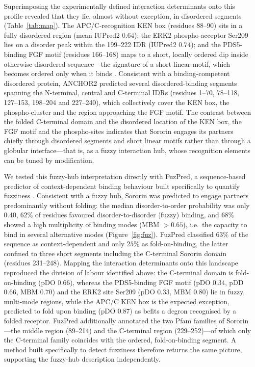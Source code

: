 \documentclass[11pt]{article}
\begin{document}
Superimposing the experimentally defined interaction determinants onto this profile revealed that they lie, almost without exception, in disordered segments (Table~\ref{tab:map}). The APC/C-recognition KEN box (residues 88--90) sits in a fully disordered region (mean IUPred2 $0.64$); the ERK2 phospho-acceptor Ser209 lies on a disorder peak within the 199--222 IDR (IUPred2 $0.74$); and the PDS5-binding FGF motif (residues 166--168) maps to a short, locally ordered dip inside otherwise disordered sequence---the signature of a short linear motif, which becomes ordered only when it binds \citep{fuxreiter2007,davey2012}. Consistent with a binding-competent disordered protein, ANCHOR2 predicted several disordered-binding segments spanning the N-terminal, central and C-terminal IDRs (residues 1--70, 78--118, 127--153, 198--204 and 227--240), which collectively cover the KEN box, the phospho-cluster and the region approaching the FGF motif. The contrast between the folded C-terminal domain and the disordered location of the KEN box, the FGF motif and the phospho-sites indicates that Sororin engages its partners chiefly through disordered segments and short linear motifs rather than through a globular interface---that is, as a fuzzy interaction hub, whose recognition elements can be tuned by modification.

We tested this fuzzy-hub interpretation directly with FuzPred, a sequence-based predictor of context-dependent binding behaviour built specifically to quantify fuzziness \citep{miskei2020,horvath2020}. Consistent with a fuzzy hub, Sororin was predicted to engage partners predominantly without folding: the median disorder-to-order probability was only $0.40$, $62\%$ of residues favoured disorder-to-disorder (fuzzy) binding, and $68\%$ showed a high multiplicity of binding modes (MBM $>0.65$), i.e.\ the capacity to bind in several alternative modes (Figure~\ref{fig:fuz}). FuzPred classified $63\%$ of the sequence as context-dependent and only $25\%$ as fold-on-binding, the latter confined to three short segments including the C-terminal Sororin domain (residues 231--248). Mapping the interaction determinants onto this landscape reproduced the division of labour identified above: the C-terminal domain is fold-on-binding (pDO $0.66$), whereas the PDS5-binding FGF motif (pDO $0.34$, pDD $0.66$, MBM $0.70$) and the ERK2 site Ser209 (pDO $0.33$, MBM $0.80$) lie in fuzzy, multi-mode regions, while the APC/C KEN box is the expected exception, predicted to fold upon binding (pDO $0.87$) as befits a degron recognised by a folded receptor. FuzPred additionally annotated the two Pfam families of Sororin---the middle region (89--214) and the C-terminal region (229--252)---of which only the C-terminal family coincides with the ordered, fold-on-binding segment. A method built specifically to detect fuzziness therefore returns the same picture, supporting the fuzzy-hub description independently.
\end{document}
